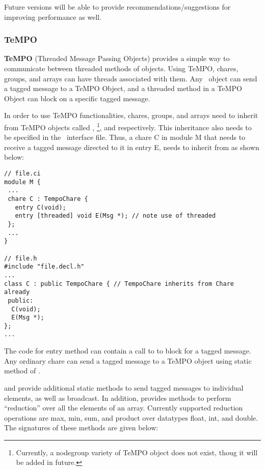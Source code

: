 Future versions will be able to provide recommendations/suggestions
for improving performance as well.

\subsubsection{TeMPO}

{\bf TeMPO} (Threaded Message Passing Objects) provides a simple way
to communicate between threaded methods of objects. Using TeMPO,
chares, groups, and arrays can have threads associated with
them. Any \charmpp\ object can send a tagged message to a TeMPO Object,
and a threaded method in a TeMPO Object can block on a specific tagged
message.

In order to use TeMPO functionalities, chares, groups, and arrays need
to inherit from TeMPO objects called , \footnote{
Currently, a nodegroup variety of TeMPO object does not exist, thoug it will
be added in future.},
and  respectively. This inheritance also needs to be
specified in the \charmpp\ interface file. Thus, a chare C in module M
that needs to receive a tagged message directed to it in entry E, 
needs to inherit from  as shown below:

\begin{verbatim}
// file.ci
module M {
 ...
 chare C : TempoChare {
   entry C(void);
   entry [threaded] void E(Msg *); // note use of threaded
 };
 ...
}

// file.h
#include "file.decl.h"
...
class C : public TempoChare { // TempoChare inherits from Chare already
 public:
  C(void);
  E(Msg *);
};
...
\end{verbatim}

The code for entry method  can contain a call to 
to block for a tagged message. Any ordinary chare can send a tagged
message to a TeMPO object using  static method of 
.

 and  provide additional static methods to
send tagged messages to individual elements, as well as broadcast. In
addition,  provides methods to perform ``reduction''
over all the elements of an array. Currently supported reduction operations
are max, min, sum, and product over datatypes float, int, and double.
The signatures of these methods are given below:

